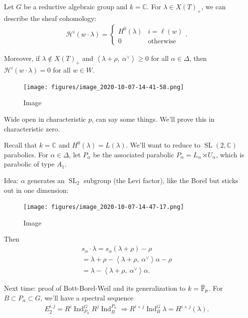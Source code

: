 \begin{theorem}

Let \(G\) be a reductive algebraic group and \(k={\mathbb{C}}\). For
\(\lambda \in X(T)_+\), we can describe the sheaf cohomology:
\begin{align*}  
\mathcal{H}^i(w\cdot \lambda)
=
\begin{cases}
H^0(\lambda) & i=\ell(w) \\
0 & \text{otherwise}
\end{cases}
.\end{align*}

Moreover, if \(\lambda \not\in X(T)_+\) and
\({\left\langle {\lambda+\rho},~{\alpha^\vee} \right\rangle} \geq 0\)
for all \(\alpha \in \Delta\), then
\(\mathcal{H}^i(w\cdot \lambda) = 0\) for all \(w\in W\).

\begin{figure}
\centering
\texttt{[image: figures/image\_2020-10-07-14-41-58.png]}
\caption{Image}
\end{figure}

\end{theorem}

Wide open in characteristic \(p\), can say some things. We'll prove this
in characteristic zero.

Recall that \(k={\mathbb{C}}\) and \(H^0(\lambda) = L(\lambda)\). We'll
want to reduce to \({\operatorname{SL}}(2, {\mathbb{C}})\) parabolics.
For \(\alpha\in\Delta\), let \(P_\alpha\) be the associated parabolic
\(P_\alpha = L_\alpha \rtimes U_\alpha\), which is parabolic of type
\(A_1\).

Idea: \(\alpha\) generates an \({\operatorname{SL}}_2\) subgroup (the
Levi factor), like the Borel but sticks out in one dimension:

\begin{figure}
\centering
\texttt{[image: figures/image\_2020-10-07-14-47-17.png]}
\caption{Image}
\end{figure}

Then
\begin{align*} 
s_\alpha \cdot \lambda = s_\alpha(\lambda + \rho) - \rho \\
= \lambda + \rho - {\left\langle {\lambda + \rho},~{\alpha^\vee} \right\rangle}\alpha - \rho \\
= \lambda - {\left\langle {\lambda + \rho},~{\alpha^\vee} \right\rangle}\alpha
.\end{align*}

Next time: proof of Bott-Borel-Weil and its generalization to
\(k = \mkern 1.5mu\overline{\mkern-1.5mu{\mathbb{F}}\mkern-1.5mu}\mkern 1.5mu_p\).
For \(B\subset P_\alpha \subset G\), we'll have a spectral sequence
\begin{align*}  
E_2^{i, j} = R^i \operatorname{Ind}_{P_\alpha}^G R^j \operatorname{Ind}_B^{P_\alpha}  \Rightarrow R^{i+j} \operatorname{Ind}_B^G  \lambda = H^{i+j}(\lambda)
.\end{align*}

